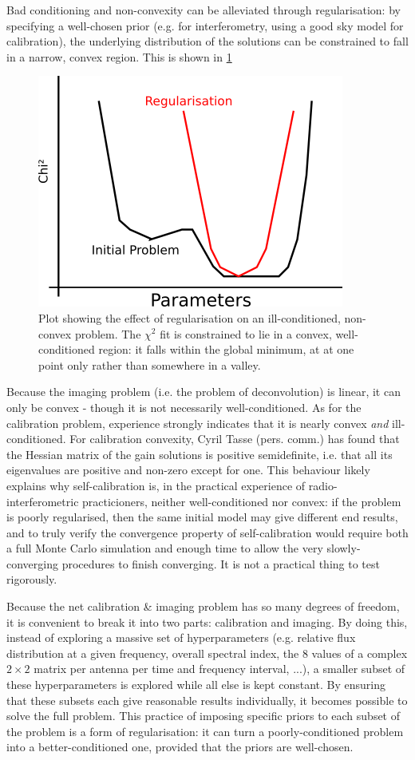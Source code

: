 \pg
Bad conditioning and non-convexity can be alleviated through regularisation: by specifying a well-chosen prior (e.g. for interferometry, using a good sky model for calibration), the underlying distribution of the solutions can be constrained to fall in a narrow, convex region. This is shown in \cref{fig.selfcal.regularise}
\begin{figure}[h!]
	\includegraphics[width=.6\linewidth]{images/regularise.png}
	\caption{\label{fig.selfcal.regularise} Plot showing the effect of regularisation on an ill-conditioned, non-convex problem. The $\chi^2$ fit is constrained to lie in a convex, well-conditioned region: it falls within the global minimum, at at one point only rather than somewhere in a valley.}
\end{figure}

\pg
Because the imaging problem (i.e. the problem of deconvolution) is linear, it can only be convex - though it is not necessarily well-conditioned. As for the calibration problem, experience strongly indicates that it is nearly convex \textit{and} ill-conditioned. For calibration convexity, Cyril Tasse (pers. comm.) has found that the Hessian matrix of the gain solutions is positive semidefinite, i.e. that all its eigenvalues are positive and non-zero except for one. This behaviour likely explains why self-calibration is, in the practical experience of radio-interferometric practicioners,  neither well-conditioned nor convex: if the problem is poorly regularised, then the same initial model may give different end results, and to truly verify the convergence property of self-calibration would require both a full Monte Carlo simulation and enough time to allow the very slowly-converging procedures to finish converging. It is not a practical thing to test rigorously.

\pg
Because the net calibration \& imaging problem has so many degrees of freedom, it is convenient to break it into two parts: calibration and imaging. By doing this, instead of exploring a massive set of hyperparameters (e.g. relative flux distribution at a given frequency, overall spectral index, the 8 values of a complex $2\times 2$ matrix per antenna per time and frequency interval, ...), a smaller subset of these hyperparameters is explored while all else is kept constant. By ensuring that these subsets each give reasonable results individually, it becomes possible to solve the full problem. This practice of imposing specific priors to each subset of the problem is a form of regularisation: it can turn a poorly-conditioned problem into a better-conditioned one, provided that the priors are well-chosen.

